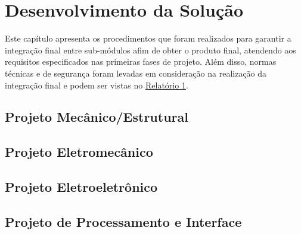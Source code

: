 \chapter{Desenvolvimento da Solução}
\label{desenvolvimento}

Este capítulo apresenta os procedimentos que foram realizados para garantir a integração final entre sub-módulos afim de obter o produto final, atendendo aos requisitos especificados nas primeiras fases de projeto.
Além disso, normas técnicas e de segurança foram levadas em consideração na realização da integração final e podem ser vistas no
\href{https://drive.google.com/file/d/0B5InkGKx6O-MR1B3eVYzZFpjQ3c/view?usp=sharing}{Relatório 1}.

\section{Projeto Mecânico/Estrutural}



\section{Projeto Eletromecânico}



\section{Projeto Eletroeletrônico}



\section{Projeto de Processamento e Interface}






